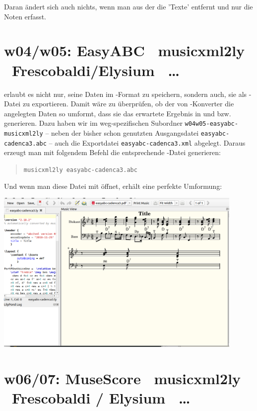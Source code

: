 Daran ändert sich auch nichts, wenn man aus der  die 'Texte'
entfernt und nur die Noten erfasst. 

\section{w04/w05: Easy\-ABC \ra\ musicxml2ly  \ra\ Frescobaldi/Elysium \ra\ \ldots}\label{w0405}

 erlaubt es nicht nur, seine Daten im -Format zu
speichern, sondern auch, sie als -Datei zu exportieren. Damit wäre
zu überprüfen, ob der von -Konverter  die
angelegten Daten so umformt, dass sie das erwartete Ergebnis in
 und  bzw.  generieren. Dazu haben
wir im weg-spezifischen Subordner \texttt{w04w05-easyabc-musicxml2ly} -- neben der
bisher schon genutzten Ausgangsdatei \texttt{easyabc-cadenca3.abc} -- auch die
Exportdatei \texttt{easyabc-cadenca3.xml} abgelegt. Daraus erzeugt man mit
folgendem Befehl die entsprechende -Datei generieren:

\begin{quote}\texttt{musicxml2ly easyabc-cadenca3.abc}\end{quote}

Und wenn man diese Datei mit  öffnet, erhält eine perfekte
Umformung:

\begin{center}
\includegraphics[width=0.9\textwidth]{frontends/easyabc/easyabc-musicxml-frescobaldi.png}
\end{center}

\section{w06/07: Muse\-Score \ra\ musicxml2ly \ra\ Frescobaldi / Elysium \ra\ \ldots}\label{w0607}

